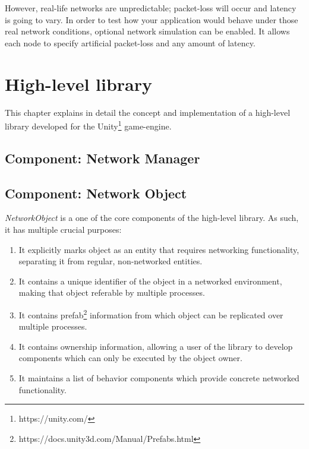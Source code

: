 \documentclass[times, utf8, diplomski]{fer}
\begin{document}
However, real-life networks are unpredictable; packet-loss will occur and latency is going to vary. In order to test how your application would behave under those real network conditions, optional network simulation can be enabled. It allows each node to specify artificial packet-loss and any amount of latency.


\chapter{High-level library}
This chapter explains in detail the concept and implementation of a high-level library developed for the Unity\footnote{https://unity.com/} game-engine.

\section{Component: Network Manager}

\section{Component: Network Object}
\textit{NetworkObject} is a one of the core components of the high-level library. As such, it has multiple crucial purposes:

\begin{enumerate}
	\item It explicitly marks object as an entity that requires networking functionality, separating it from regular, non-networked entities.
	\item It contains a unique identifier of the object in a networked environment, making that object referable by multiple processes.
	\item It contains prefab\footnote{https://docs.unity3d.com/Manual/Prefabs.html} information from which object can be replicated over multiple processes.
	\item It contains ownership information, allowing a user of the library to develop components which can only be executed by the object owner.
	\item It maintains a list of behavior components which provide concrete networked functionality.
\end{enumerate}
\end{document}
